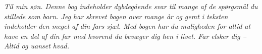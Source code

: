
\thispagestyle{empty}

\hfill

\vfill

\begin{center}
	\emph{Til min søn. Denne bog indeholder dybdegående svar til mange af de spørgsmål du stillede som barn. Jeg har skrevet bogen over mange år og gemt i teksten indeholder den meget af din fars sjæl. Med bogen har du muligheden for altid at have en del af din far med hvorend du bevæger dig hen i livet. Far elsker dig -- Altid og uanset hvad.}
\end{center}
\vfill







